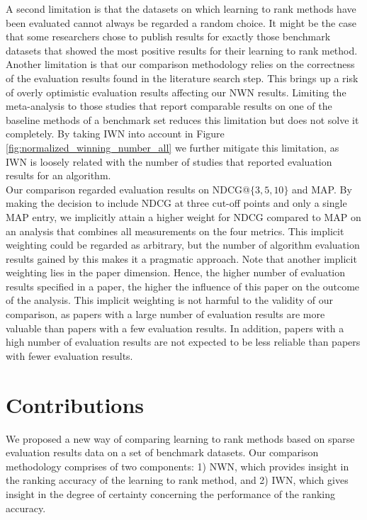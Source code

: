 \documentclass[english, authoryear, preprint]{elsarticle}
\begin{document}
A second limitation is that the datasets on which learning to rank methods have been evaluated cannot always be regarded a random choice. It might be the case that some researchers chose to publish results for exactly those benchmark datasets that showed the most positive results for their learning to rank method.\\

Another limitation is that our comparison methodology relies on the correctness of the evaluation results found in the literature search step. This brings up a risk of overly optimistic evaluation results affecting our NWN results. Limiting the meta-analysis to those studies that report comparable results on one of the baseline methods of a benchmark set reduces this limitation but does not solve it completely. By taking IWN into account in Figure \ref{fig:normalized_winning_number_all} we further mitigate this limitation, as IWN is loosely related with the number of studies that reported evaluation results for an algorithm.\\

Our comparison regarded evaluation results on NDCG@$\{3,5,10\}$ and MAP. By making the decision to include NDCG at three cut-off points and only a single MAP entry, we implicitly attain a higher weight for NDCG compared to MAP on an analysis that combines all measurements on the four metrics. This implicit weighting could be regarded as arbitrary, but the number of algorithm evaluation results gained by this makes it a pragmatic approach. Note that another implicit weighting lies in the paper dimension. Hence, the higher number of evaluation results specified in a paper, the higher the influence of this paper on the outcome of the analysis. This implicit weighting is not harmful to the validity of our comparison, as papers with a large number of evaluation results are more valuable than papers with a few evaluation results. In addition, papers with a high number of evaluation results are not expected to be less reliable than papers with fewer evaluation results.

\section{Contributions}
We proposed a new way of comparing learning to rank methods based on sparse evaluation results data on a set of benchmark datasets. Our comparison methodology comprises of two components: 1) NWN, which provides insight in the ranking accuracy of the learning to rank method, and 2) IWN, which gives insight in the degree of certainty concerning the performance of the ranking accuracy.\\
\end{document}
